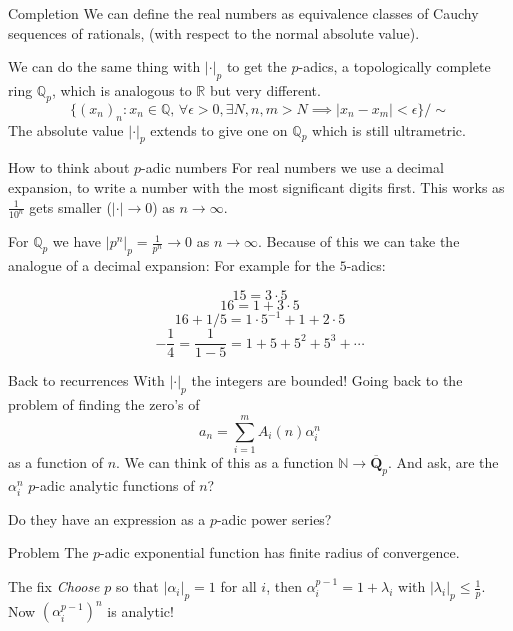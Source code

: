 \documentclass[notheorems]{beamer}
\theoremstyle{plain}
\newcommand{\NN}{\mathbb{N}}
\newcommand{\QQ}{\mathbb Q}
\newcommand{\RR}{\mathbb R}
\begin{document}
\begin{frame}{Completion}
    We can define the real numbers as equivalence classes of Cauchy sequences of rationals, (with respect to the normal absolute value).

    We can do the same thing with  $|\cdot |_p$ to get the $p$-adics, a topologically complete ring $\QQ_p$, which is analogous to $\RR$ but very different.
    \[\{(x_n)_n : x_n \in \QQ,\, \forall \epsilon > 0, \exists N, n,m > N \implies | x_n - x_m| < \epsilon  \}/ \sim\]
    The absolute value $|\cdot|_p$ extends to give one on $\QQ_p$ which is still ultrametric.
\end{frame}

\begin{frame}{How to think about $p$-adic numbers}
    For real numbers we use a decimal expansion, to write a number with the most significant digits first.
    This works as $\frac{1}{10^n}$ gets smaller ($|\cdot|\to0$) as $n \to \infty$.

    \pause
    For $\QQ_p$ we have $|p^n|_p = \frac1{p^n} \to 0$ as $n \to \infty$.
    Because of this we can take the analogue of a decimal expansion:
    For example for the $5$-adics:

    \[15 = 3 \cdot 5\]
    \pause
        \[16 = 1 + 3 \cdot 5\]
    \pause
        \[16 + 1/5 = 1 \cdot 5^{-1} + 1 +  2 \cdot 5\]
    \pause
        \[-\frac14 = \frac1{1-5} = 1+ 5 + 5^2 + 5^3 + \cdots\]
\end{frame}

\begin{frame}{Back to recurrences}
    With \(|\cdot|_p\) the integers are bounded!
    \pause
    Going back to the problem of finding the zero's of
    \begin{equation*}
        a_n = \sum_{i=1}^m A_i(n)\alpha_i^n
    \end{equation*}
    as a function of $n$.
    We can think of this as a function $\NN \to \overline{\mathbf Q}_p$.
    And ask, are the $\alpha_i^n$
    \(p\)-adic analytic functions of \(n\)?%
    
    Do they have an expression as a $p$-adic power series?
    \par
    \pause
    \begin{alertblock}{Problem}
        The \(p\)-adic exponential function has finite radius of convergence.
    \end{alertblock}
    \pause
    \begin{exampleblock}{The fix}
        \emph{Choose} \(p\) so that \(|\alpha_i|_p = 1\) for all \(i\), then \(\alpha_i^{p-1} = 1 + \lambda_i\) with \(|\lambda_i|_p \le \frac 1p\).
        Now \((\alpha_i^{p-1})^n\) is analytic!%
    \end{exampleblock}
\end{frame}
\end{document}
